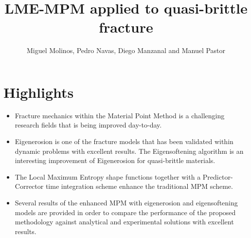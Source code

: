 \documentclass[12pt,a4paper]{article}
\title{LME-MPM applied to quasi-brittle fracture}
\author{Miguel Molinos, Pedro Navas, Diego Manzanal and Manuel Pastor}
\begin{document}
\maketitle

\centering
\section*{Highlights}
\setlength{\parskip}{1cm plus 5mm minus 4mm}
\begin{itemize}
\item Fracture mechanics within the Material Point Method is a challenging research fields that is being improved day-to-day.

\item Eigenerosion is one of the fracture models that has been validated within dynamic problems with excellent results. The Eigensoftening algorithm is an interesting improvement of Eigenerosion for quasi-brittle materials.

\item The Local Maximum Entropy shape functions together with a Predictor-Corrector time integration scheme enhance the traditional MPM scheme.

\item Several results of the enhanced MPM with eigenerosion and eigensoftening models are provided in order to compare the performance of the proposed methodology against analytical and experimental solutions with excellent results.

\end{itemize}
\end{document}
